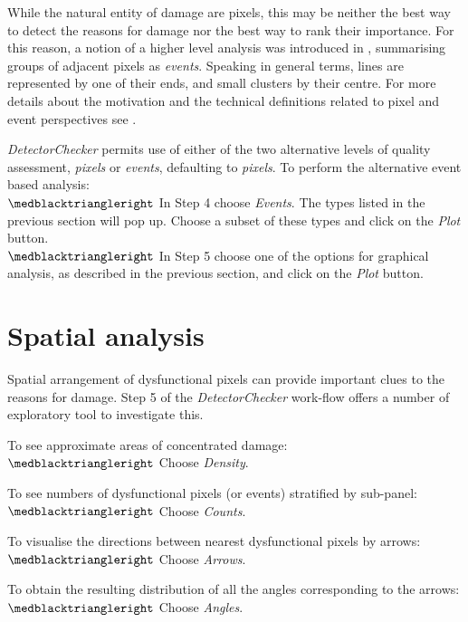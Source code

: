 \documentclass[11pt,a4paper]{article}
\newcommand{\DetectorChecker}{\emph{DetectorChecker}\xspace}
\begin{document}
While the natural entity of damage are pixels, this may
be neither the best way
to detect the reasons for damage nor 
the best way to rank their importance. For this reason,
a notion of a higher level analysis was introduced in
\cite{brettschneider2017crism}, summarising 
groups of adjacent pixels as \emph{events}. 
Speaking in general terms, lines are represented by one of their ends, and small clusters by their centre. For more details about the motivation and the technical definitions related to pixel and event perspectives see \cite{brettschneider2017crism}.

\DetectorChecker permits use of either of the two alternative levels of quality assessment, \emph{pixels}
or \emph{events}, defaulting to \emph{pixels}.
To perform the alternative event based analysis:\\
$\medblacktriangleright$ In Step 4 choose \emph{Events}. The types listed in the previous section will pop up. Choose a subset of these types and click on the \emph{Plot} button.\\
$\medblacktriangleright$ In Step 5 choose one of the options for graphical analysis, as described in the previous section, and 
click on the \emph{Plot} button.



\section{Spatial analysis}\label{spatial}

Spatial arrangement of dysfunctional pixels
can provide important clues to the reasons for damage.
Step 5 of the \DetectorChecker work-flow 
offers a number of exploratory tool to investigate this.

To see approximate areas of concentrated damage:\\
$\medblacktriangleright$ Choose \emph{Density}.

To see numbers of dysfunctional pixels (or events) stratified by sub-panel:\\
$\medblacktriangleright$ Choose \emph{Counts}.

To visualise the directions between nearest dysfunctional pixels by arrows:
\\
$\medblacktriangleright$ Choose \emph{Arrows}.

To obtain the resulting distribution of all the angles corresponding to the arrows:\\ 
$\medblacktriangleright$ Choose \emph{Angles}.
\end{document}
